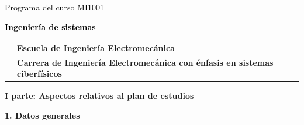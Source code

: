 \documentclass[letterpaper]{article}%
\begin{document}
%
\normalsize%
\thispagestyle{empty}%
%
\vspace*{100mm}%
\par\fontsize{14}{0}\selectfont \textcolor{black}{Programa del curso MI1001}%
\par\fontsize{18}{25}\selectfont \textbf{\textcolor{black}{Ingeniería de sistemas}}%
\vspace*{15mm}%
\newline%
\begin{tabularx}{\textwidth}{m{}m{}}%
&\hspace*{0mm}\fontsize{12}{0}\selectfont \textbf{\textcolor{gris}{Escuela de Ingeniería Electromecánica}}\\%
[-12pt]%
&\hspace*{0mm}\fontsize{12}{0}\selectfont \textbf{\textcolor{gris}{Carrera de Ingeniería Electromecánica con énfasis en sistemas ciberfísicos}}\\%
\end{tabularx}%
\newpage%
\pagestyle{headfoot}%
\par\fontsize{14}{0}\selectfont \textbf{\textcolor{parte}{I parte: Aspectos relativos al plan de estudios}}%
\par\hspace*{2mm}\fontsize{12}{14}\selectfont \textbf{\textcolor{parte}{1. Datos generales}}%
\vspace*{3mm}%
\newline%
\fontsize{10}{12}\selectfont %
\end{document}
